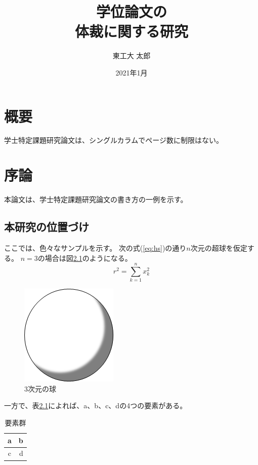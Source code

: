 \documentclass[80pt,oneside,openany,report]{jsbook}
\title{学位論文の\\体裁に関する研究}
\author{東工大 太郎}
\affiliation{東京工業大学\\情報理工学院\\情報工学系}
\date{2021年1月}
\begin{document}
\frontmatter
\maketitle

\chapter{概要}
学士特定課題研究論文は、シングルカラムでページ数に制限はない。

\tableofcontents
\listoffigures
\listoftables


\mainmatter
\chapter{序論}
本論文は、学士特定課題研究論文の書き方\cite{tokodai-xyz2015}の一例を示す。

\section{本研究の位置づけ}
ここでは、色々なサンプルを示す。
次の式(\ref{eq:hs})の通り$n$次元の超球を仮定する。
$n=3$の場合は図\ref{fig:hs}のようになる。
\begin{equation}
  r^2 = \sum_{k=1}^{n} x_k^2 \label{eq:hs}
\end{equation}
\begin{figure}[tb]
  \centering
  \includegraphics[scale=1.0]{fig/sample.png}
  \caption{3次元の球}\label{fig:hs}
\end{figure}

一方で、表\ref{tab:sample}によれば、a、b、c、dの4つの要素がある。
\begin{table}[tb]
  \centering
  \caption{要素群}\label{tab:sample}
  \begin{tabular}{|c|r|}
    \hline
    a & b \\ \hline
    c & d \\ \hline
  \end{tabular}
\end{table}
\end{document}
